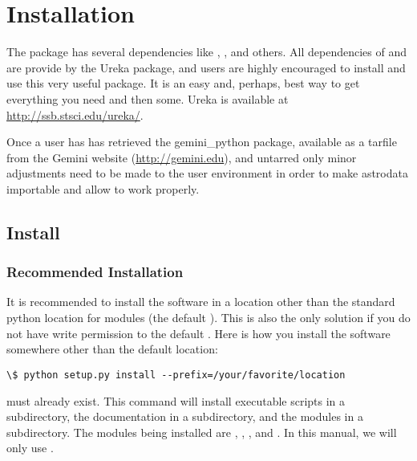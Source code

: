 \documentclass[letterpaper,10pt,english]{sphinxmanual}
\begin{document}
\chapter{Installation}
\label{userenv:installation}\label{userenv::doc}
The  package has several dependencies like , ,
and others. All dependencies of  and  are provide by
the Ureka package, and users are highly encouraged to install and use this very
useful package. It is an easy and, perhaps, best way to get everything you need
and then some. Ureka is available at \href{http://ssb.stsci.edu/ureka/}{http://ssb.stsci.edu/ureka/}.

Once a user has has retrieved the gemini\_python package, available as a tarfile
from the Gemini website (\href{http://gemini.edu}{http://gemini.edu}), and untarred only minor adjustments
need to be made to the user environment in order to make astrodata importable and
allow  to work properly.


\section{Install}
\label{userenv:config}\label{userenv:install}

\subsection{Recommended Installation}
\label{userenv:recommended-installation}
It is recommended to install the software in a location other than the standard
python location for modules (the default ). This is also the
only solution if you do not have write permission to the default .
Here is how you install the software somewhere other than the default location:

\begin{Verbatim}[commandchars=\\\{\}]
\$ python setup.py install --prefix=/your/favorite/location
\end{Verbatim}

 must already exist.  This command will install executable
scripts in a  subdirectory, the documentation in a  subdirectory,
and the modules in a  subdirectory.  The modules being
installed are , , , and .
In this manual, we will only use .
\end{document}
